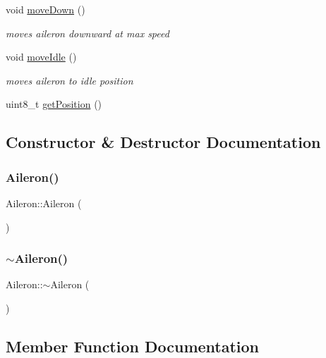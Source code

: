 \begin{DoxyCompactItemize}
void \hyperlink{class_aileron_a7c4b7d445e5b0b7469e819e5068db841}{move\+Down} ()
\begin{DoxyCompactList}\small\item\em moves aileron downward at max speed \end{DoxyCompactList}\item 
void \hyperlink{class_aileron_a52f780193672d894137866203860f817}{move\+Idle} ()
\begin{DoxyCompactList}\small\item\em moves aileron to idle position \end{DoxyCompactList}\item 
uint8\+\_\+t \hyperlink{class_aileron_a2eaf14f5794bb55035b19499f0c1ec6c}{get\+Position} ()
\end{DoxyCompactItemize}


\subsection{Constructor \& Destructor Documentation}
\mbox{\label{class_aileron_ad2f851e39ec1eb19aeb0fbe2bdf4ef9c}} 
\subsubsection{\texorpdfstring{Aileron()}{Aileron()}}
{\footnotesize\ttfamily Aileron\+::\+Aileron (\begin{DoxyParamCaption}{ }\end{DoxyParamCaption})}

\mbox{\label{class_aileron_af05fcc71c65e31b919612cce2b0a5449}} 
\subsubsection{\texorpdfstring{$\sim$\+Aileron()}{~Aileron()}}
{\footnotesize\ttfamily Aileron\+::$\sim$\+Aileron (\begin{DoxyParamCaption}{ }\end{DoxyParamCaption})}



\subsection{Member Function Documentation}
\mbox{\label{class_aileron_a2eaf14f5794bb55035b19499f0c1ec6c}} 
